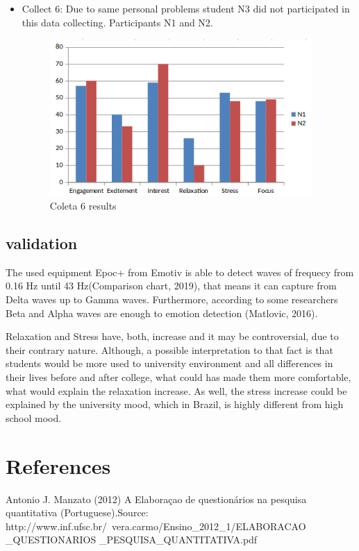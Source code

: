 \documentclass[12pt,openright,a4paper]{article}
\begin{document}
\begin{itemize}
\item Collect 6: Due to same personal problems student N3 did not participated in this data collecting. Participants N1 and N2.  
\begin{figure}[H]
	\centering
	\includegraphics[width=10cm]{./Coleta6.png}
	\caption{Coleta 6 results}
\end{figure}

\end{itemize}


\subsection{validation}
The used equipment Epoc+ from Emotiv is able to detect waves of frequecy from 0.16 Hz until 43 Hz(Comparison chart, 2019), that means it can capture from Delta waves up to Gamma waves. Furthermore, according to some researchers Beta and Alpha waves are enough to emotion detection (Matlovic, 2016).  

Relaxation and Stress have, both, increase and it may be controversial, due to their contrary nature. Although, a possible interpretation to that fact is that students would be more used to university environment and all differences in their lives before and after college, what could has made them more comfortable, what would explain the relaxation increase. As well, the stress increase could be explained  by the university mood, which in Brazil, is highly different from high school mood.

\newpage
\section{References}

  Antonio J. Manzato (2012) A Elaboraçao de questionários na pesquisa quantitativa (Portuguese).Source: http://www.inf.ufsc.br/~vera.carmo/Ensino\_2012\_1/ELABORACAO\\ \_QUESTIONARIOS \_PESQUISA\_QUANTITATIVA.pdf\newline
   
\end{document}

